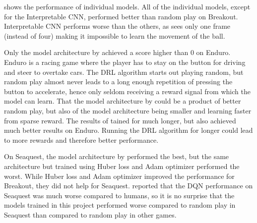  shows the performance of individual models. All of the individual models, except for the Interpretable CNN, performed better than random play on Breakout. Interpretable CNN performs worse than the others, as sees only one frame (instead of four) making it impossible to learn the movement of the ball.

Only the model architecture by \textcite{mnih_playing_2013} achieved a score higher than 0 on Enduro. Enduro is a racing game where the player has to stay on the button for driving and steer to overtake cars. The DRL algorithm starts out playing random, but random play almost never leads to a long enough repetition of pressing the button to accelerate, hence only seldom receiving a reward signal from which the model can learn. That the model architecture by \textcite{mnih_playing_2013} could be a product of better random play, but also of the model architecture being smaller and learning faster from sparse reward. The results of \textcite{mnih_playing_2013,mnih_human-level_2015} tained for much longer, but also achieved much better results on Enduro. Running the DRL algorithm for longer could lead to more rewards and therefore better performance. 

On Seaquest, the model architecture by \textcite{mnih_human-level_2015} performed the best, but the same architecture but trained using Huber loss and Adam optimizer performed the worst. While Huber loss and Adam optimizer improved the performance for Breakout, they did not help for Seaquest. \textcite{mnih_playing_2013} reported that the DQN performance on Seaquest was much worse compared to humans, so it is no surprise that the models trained in this project performed worse compared to random play in Seaquest than compared to random play in other games.


